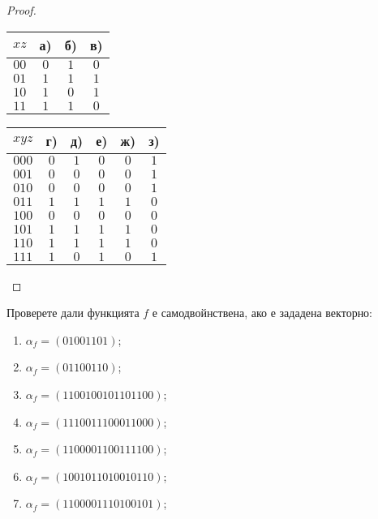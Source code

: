 \begin{proof}
  \begin{table}[H]
    \begin{subtable}{0.5\textwidth}
      \begin{tabular}[b]{|c||c|c|c|}
        \hline
        $xz$ & а) & б) & в)\\
        \hline
        $00$ & $0$ & $1$ & $0$ \\
        \hline
        $01$ & $1$ & $1$ & $1$\\
        \hline
        \hline
        $10$ & $1$ & $0$ & $1$\\
        \hline
        $11$ & $1$ & $1$ & $0$\\
        \hline
      \end{tabular}
    \end{subtable}
    \begin{subtable}{0.5\textwidth}
      \begin{tabular}[b]{|c||c|c|c|c|c|}
        \hline
        $xyz$ & г) & д) & е) & ж) & з)\\
        \hline
        $000$ & $0$ & $1$ & $0$ & $0$ & $1$\\
        \hline
        $001$ & $0$ & $0$ & $0$ & $0$ & $1$\\
        \hline
        $010$ & $0$ & $0$ & $0$ & $0$ & $1$\\
        \hline
        $011$ & $1$ & $1$ & $1$ & $1$ & $0$\\
        \hline
        \hline
        $100$ & $0$ & $0$ & $0$ & $0$ & $0$\\
        \hline
        $101$ & $1$ & $1$ & $1$ & $1$ & $0$\\
        \hline
        $110$ & $1$ & $1$ & $1$ & $1$ & $0$\\
        \hline
        $111$ & $1$ & $0$ & $1$ & $0$ & $1$\\
        \hline
      \end{tabular}
    \end{subtable}
  \end{table}
\end{proof}


\begin{problem}
  Проверете дали функцията $f$ е самодвойнствена, ако е зададена векторно:
  \begin{enumerate}[1)]
  \item
    $\alpha_f = (01001101)$;
  \item
    $\alpha_f = (01100110)$;
  \item
    $\alpha_f = (1100 1001 0110 1100)$;
  \item
    $\alpha_f = (1110 0111 0001 1000)$;
  \item
    $\alpha_f = (1100 0011 0011 1100)$;
  \item
    $\alpha_f = (1001 0110 1001 0110)$;
  \item
    $\alpha_f = (1100 0011 1010 0101)$;
  \end{enumerate}
\end{problem}

